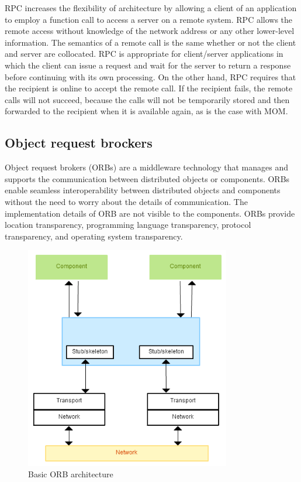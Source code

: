 RPC increases the flexibility of architecture by allowing a client of an application to employ a function call to access a server on a remote system. RPC allows the remote access without knowledge of the network address or any other lower-level information. The semantics of a remote call is the same whether or not the client and server are collocated. RPC is appropriate for client/server applications in which the client can issue a request and wait for the server to return a response before continuing with its own processing. On the other hand, RPC requires that the recipient is online to accept the remote call. If the recipient fails, the remote calls will not succeed, because the calls will not be temporarily stored and then forwarded to the recipient when it is available again, as is the case with MOM.

\subsection{Object request brockers}

Object request brokers (ORBs) are a middleware technology that manages and supports the communication between distributed objects or components. ORBs enable seamless interoperability between distributed objects and components without the need to worry about the details of communication. The implementation details of ORB are not visible to the components. ORBs provide location transparency, programming language transparency, protocol transparency, and operating system transparency.

\begin{figure}
    \centering
    \includegraphics[width=0.8\textwidth]{resources/ORB.png}
    \caption{Basic ORB architecture}
    \label{fig:orb}
\end{figure}

